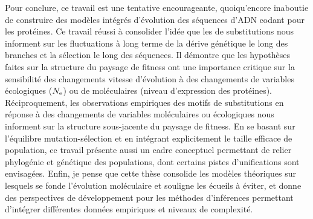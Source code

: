 Pour conclure, ce travail est une tentative encourageante, quoiqu'encore inaboutie de construire des modèles intégrés d'évolution des séquences d'ADN codant pour les protéines.
Ce travail réussi à consolider l'idée que les  de substitutions nous informent sur les fluctuations à long terme de la dérive génétique le long des branches et la sélection le long des séquences.
Il démontre que les hypothèses faites sur la structure du paysage de fitness ont une importance critique sur la sensibilité des changements vitesse d'évolution à des changements de variables écologiques ($N_{\textrm{e}}$) ou de moléculaires (niveau d'expression des protéines).
Réciproquement, les observations empiriques des motifs de substitutions en réponse à des changements de variables moléculaires ou écologiques nous informent sur la structure sous-jacente du paysage de fitness.
En se basant sur l'équilibre mutation-sélection et en intégrant explicitement le taille efficace de population, ce travail présente aussi un cadre conceptuel permettant de relier phylogénie et génétique des populations, dont certains pistes d'unifications sont envisagées.
Enfin, je pense que cette thèse consolide les modèles théoriques sur lesquels se fonde l'évolution moléculaire et souligne les écueils à éviter, et donne des perspectives de développement pour les méthodes d'inférences permettant d'intégrer différentes données empiriques et niveaux de complexité.
